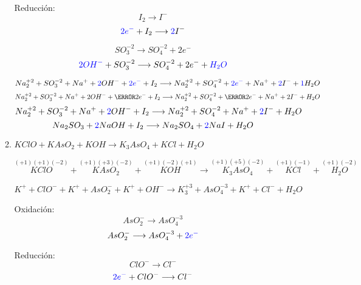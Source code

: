 \documentclass[../Práctica.root.tex]{subfiles}
\newcommand{\lra}{\ensuremath{\longrightarrow{}}}
\newcommand{\sr}[2]{\stackrel{#1}{#2}}
\begin{document}
\begin{enumerate}
\begin{enumerate}
\begin{multicols}{2}
                        \columnbreak

                        Reducción:
                        \[ I_2 \lra I^- \]
                        \[ \blue{2e^-} + I_2 \lra \blue{2} I^- \]
                    \end{multicols}


                    \[ SO_3^{-2} \lra SO_4^{-2} + 2 e^- \]
                    \[ \blue{2 OH^-} + SO_3^{-2} \lra SO_4^{-2} + 2 e^- + \blue{H_2O} \]

                    \[ Na_2^{+2} + SO_3^{-2} + Na^+ + \blue{2} OH^- + \blue{2 e^-} + I_2 \\
                        \lra Na_2^{+2} + SO_4^{-2} + \blue{2 e^-} + Na^+ + \blue{2} I^- + \blue{1} H_2O \]
                    \[ Na_2^{+2} + SO_3^{-2} + Na^+ + 2 OH^- + \cancel{2 e^-} + I_2 \\
                        \lra Na_2^{+2} + SO_4^{-2} + \cancel{2 e^-} + Na^+ + 2 I^- + H_2O \]
                    \[ Na_2^{+2} + SO_3^{-2} + Na^+ + \blue{2} OH^- + I_2 \\
                        \lra Na_2^{+2} + SO_4^{-2} + Na^+ + \blue{2} I^- + H_2O \]
                    \[ Na_2SO_3 + \blue{2} NaOH + I_2 \lra Na_2SO_4 + \blue{2} NaI + H_2O \]

              \item $KClO + KAsO_2 + KOH \lra K_3AsO_4 + KCl + H_2O$

                    $\sr{(+1)(+1)(-2)}{KClO} + \sr{(+1)(+3)(-2)}{KAsO_2} + \sr{(+1)(-2)(+1)}{KOH}
                        \lra \sr{(+1)(+5)(-2)}{K_3AsO_4} + \sr{(+1)(-1)}{KCl} + \sr{(+1)(-2)}{H_2O}$

                    \[ K^+ + ClO^- + K^+ + AsO_2^- + K^+ + OH^- \lra K_3^{+3} + AsO_4^{-3} + K^+ + Cl^- + H_2O \]
                    \begin{multicols}{2}
                        Oxidación:
                        \[ AsO_2^- \lra AsO_4^{-3} \]
                        \[ AsO_2^- \lra AsO_4^{-3} + \blue{2e^-} \]

                        \columnbreak

                        Reducción:
                        \[ ClO^- \lra Cl^- \]
                        \[ \blue{2e^-} + ClO^- \lra Cl^- \]
                    \end{multicols}


\end{enumerate}
\end{enumerate}
\end{document}
